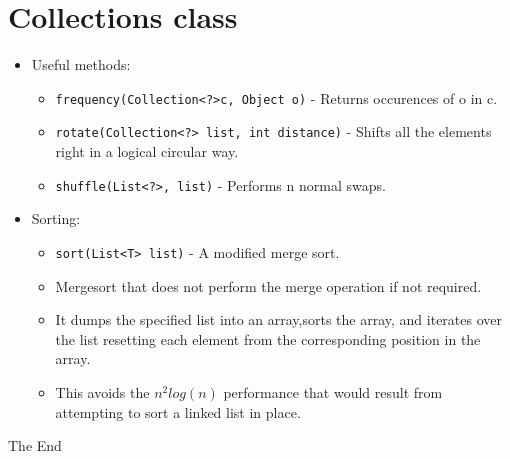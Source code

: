 \documentclass{beamer}
\begin{document}
\section{Collections class}
\begin{frame}
\begin{itemize}
\item Useful methods:
\begin{itemize}
\item \texttt{frequency(Collection<?>c, Object o)} - Returns occurences of o in c.
\item \texttt{rotate(Collection<?> list, int distance)} - Shifts all the elements right in a logical circular way.
\item \texttt{shuffle(List<?>, list)} - Performs n normal swaps.
\end{itemize}
\item Sorting:
\begin{itemize}
\item \texttt{sort(List<T> list)} - A modified merge sort.
\item Mergesort that does not perform the merge operation if not required.
\item It dumps the specified list into an array,sorts the array, and iterates over the list resetting each element from the corresponding position in the array.
\item This avoids the $n^2log(n)$ performance that would result from attempting to sort a linked list in place.
\end{itemize}
\end{itemize}
\end{frame}
\begin{frame}
\Huge{\centerline{The End}}
\end{frame}

\end{document}
